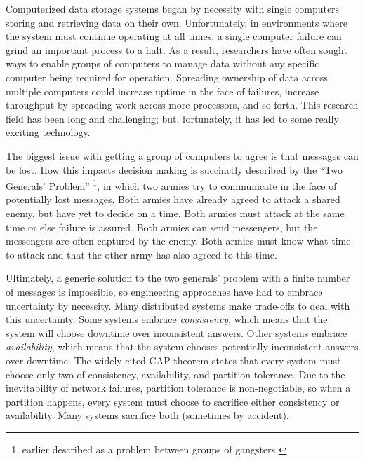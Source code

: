 \documentclass[8pt,fleqn,openany]{book}
\begin{document}
Computerized data storage systems began by necessity with single computers
storing and retrieving data on their own. Unfortunately, in environments where
the system must continue operating at all times, a single computer failure can
grind an important process to a halt. As a result, researchers have often
sought ways to enable groups of computers to manage data
without any specific computer being required for operation. Spreading ownership
of data across multiple computers could increase uptime in the face of failures,
increase throughput by spreading work across more processors, and so forth.
This research field has been long and challenging; but, fortunately, it has led
to some really exciting technology.

The biggest issue with getting a group of computers to agree is that messages
can be lost. How this impacts decision making is succinctly described by the
``Two Generals' Problem'' \cite{two-generals}
\footnote{earlier described as a problem
between groups of gangsters \cite{two-gangsters}}, in which two armies try to
communicate in the face of potentially lost messages. Both armies have already
agreed to attack a shared enemy, but have yet to decide on a time. Both armies
must attack at the same time or else failure is assured. Both armies can send
messengers, but the messengers are often captured by the enemy. Both armies must
know what time to attack and that the other army has also agreed to this time.

Ultimately, a generic solution to the two generals' problem with a finite number
of messages is impossible, so engineering approaches have had
to embrace uncertainty by necessity. Many distributed systems make trade-offs to
deal with this uncertainty. Some systems embrace {\em consistency}, which means
that the system will choose downtime over inconsistent answers. Other
systems embrace {\em availability}, which means that the system chooses
potentially inconsistent answers over downtime. The widely-cited CAP
theorem \cite{cap1, cap2} states that every system must choose only two of
consistency, availability, and partition tolerance.
Due to the inevitability of network
failures, partition tolerance is non-negotiable, so when a partition happens,
every system must choose to sacrifice either consistency or availability. Many
systems sacrifice both (sometimes by accident).
\end{document}
